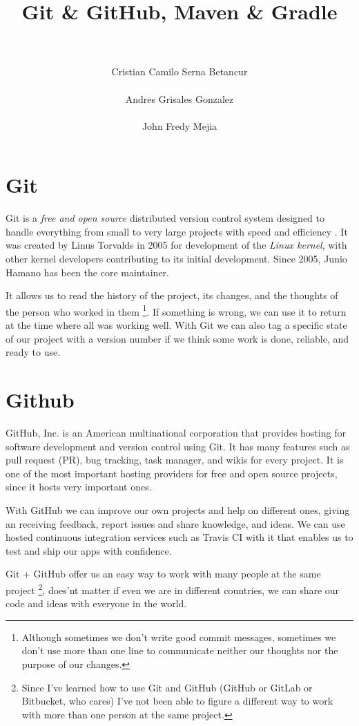 \documentclass[a4paper,11pt]{article}
\title{Git \& GitHub, Maven \& Gradle}
\author{\\\\ Cristian Camilo Serna Betancur \\\\ Andres Grisales Gonzalez  \\\\ John Fredy Mejia}
\begin{document}
\maketitle
\tableofcontents

\section{Git}
Git is a \emph{free and open source} distributed version control system designed 
to handle everything from small to very large projects with speed and efficiency
\cite{GIT:1}. It was created by Linus Torvalds in 2005 for development of the 
\emph{Linux kernel}, with other kernel developers contributing to its initial 
development. Since 2005, Junio Hamano has been the core maintainer\cite{GIT:2}.

It allows us to read the history of the project, its changes, and the thoughts 
of the person who worked in them \footnote{Although sometimes we don't write 
good commit messages, sometimes we don't use more than one line to communicate 
neither our thoughts nor the purpose of our changes.}. If something is wrong, 
we can use it to return at the time where all was working well. With Git we can 
also tag a specific state of our project with a version number if we think some 
work is done, reliable, and ready to use.

\section{Github}
GitHub, Inc. is an American multinational corporation that provides hosting for 
software development and version control using Git\cite{GITHUB:1}. It has many 
features such as pull request (PR), bug tracking, task manager, and wikis for 
every project. It is one of the most important hosting providers for free and 
open source projects, since it hosts very important ones.

With GitHub we can improve our own projects and help on different ones, giving 
an receiving feedback, report issues and share knowledge, and ideas. We can use
hosted continuous integration services such as Travis CI with it that enables us
to test and ship our apps with confidence\cite{TRAVIS:1}.

Git $+$ GitHub offer us an easy way to work with many people at the same project
\footnote{Since I've learned how to use Git and GitHub (GitHub or GitLab or 
Bitbucket, who cares) I've not been able to figure a different way to work with 
more than one person at the same project.}, does'nt matter if even we are in 
different countries, we can share our code and ideas with everyone in the world.
\end{document}
